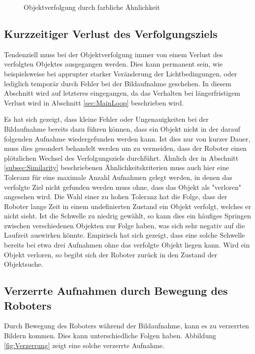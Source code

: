 \begin{figure}[h]
\centering
\caption{Objektverfolgung durch farbliche Ähnlichkeit}
\label{fig:FarbKriterium}
\end{figure}

\subsection{Kurzzeitiger Verlust des Verfolgungsziels}

Tendenziell muss bei der Objektverfolgung immer von einem Verlust des verfolgten Objektes ausgegangen werden. Dies kann permanent sein, wie beispielsweise bei apprupter starker Veränderung der Lichtbedingungen, oder lediglich temporär durch Fehler bei der Bildaufnahme geschehen. In diesem Abschnitt wird auf letzteres eingegangen, da das Verhalten bei längerfristigem Verlust wird in Abschnitt \ref{sec:MainLoop} beschrieben wird.

Es hat sich gezeigt, dass kleine Fehler oder Ungenauigkeiten bei der Bildaufnahme bereits dazu führen können, dass ein Objekt nicht in der darauf folgenden Aufnahme wiedergefunden werden kann. Ist dies nur von kurzer Dauer, muss dies gesondert behandelt werden um zu vermeiden, dass der Roboter einen plötzlichen Wechsel des Verfolgungsziels durchführt. Ähnlich der in Abschnitt \ref{subsec:Similarity} beschriebenen Ähnlichkeitskriterien muss auch hier eine Toleranz für eine maximale Anzahl Aufnahmen gelegt werden, in denen das verfolgte Ziel nicht gefunden werden muss ohne, dass das Objekt als "verloren" angesehen wird. Die Wahl einer zu hohen Toleranz hat die Folge, dass der Roboter lange Zeit in einem undefinierten Zustand ein Objekt verfolgt, welches er nicht sieht. Ist die Schwelle zu niedrig gewählt, so kann dies ein häufiges Springen zwischen verschiedenen Objekten zur Folge haben, was sich sehr negativ auf die Laufzeit auswirken könnte. Empirisch hat sich gezeigt, dass eine solche Schwelle bereits bei etwa drei Aufnahmen ohne das verfolgte Objekt liegen kann. Wird ein Objekt verloren, so begibt sich der Roboter zurück in den Zustand der Objektsuche.


\subsection{Verzerrte Aufnahmen durch Bewegung des Roboters}

Durch Bewegung des Roboters während der Bildaufnahme, kann es zu verzerrten Bildern kommen. Dies kann unterschiedliche Folgen haben. Abbildung \ref{fig:Verzerrung} zeigt eine solche verzerrte Aufnahme. 

